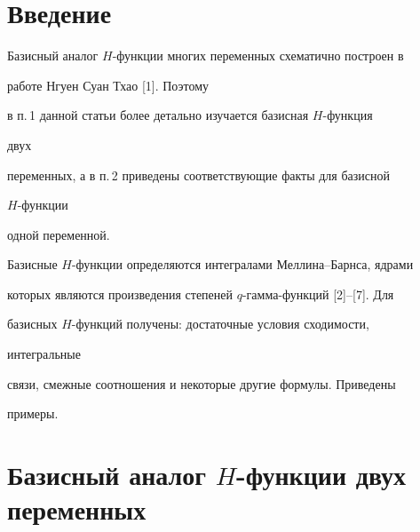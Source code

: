 \pagestyle{plain} %


 




\maketitle 


\label{begin} 


 


\section*{Введение} 


 


Базисный аналог $H$-функции многих переменных схематично построен в 


работе Нгуен Суан Тхао [1]. Поэтому 


в п.\,1 данной статьи более детально изучается базисная $H$-функция 


двух 


переменных, а в п.\,2 приведены соответствующие факты для базисной 


$H$-функции 


одной переменной. 


 


Базисные $H$-функции определяются интегралами Меллина--Барнса, ядрами 


которых являются произведения степеней $q$-гамма-функций [2]--[7]. Для 


базисных $H$-функций получены: достаточные условия сходимости, 


интегральные 


связи, смежные соотношения и некоторые другие формулы. Приведены 


примеры. 


 


\section{Базисный аналог $H$-функции двух переменных} 


 


